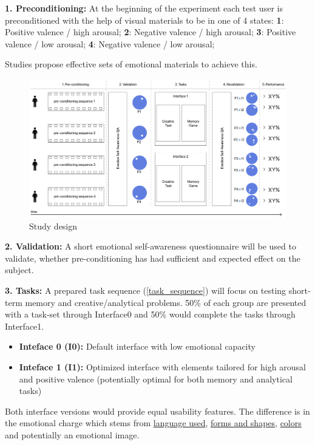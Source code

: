 \textbf{1. Preconditioning:} At the beginning of the experiment each test user is preconditioned with the help of visual materials to be in one of 4 states:
 \textbf{1}: Positive valence / high arousal; 
 \textbf{2}: Negative valence / high arousal;
 \textbf{3}: Positive valence / low arousal;
 \textbf{4}: Negative valence / low arousal;

Studies \citationneeded propose effective sets of emotional materials to achieve this.

\begin{figure}
	\begin{center}
		\includegraphics[width=1\textwidth]{images/study_design3.png}
		\caption{Study design\label{fig:scaled_diss}}
	\end{center}
\end{figure}

\textbf{2. Validation:} A short emotional self-awareness questionnaire will be used to validate, whether pre-conditioning has had sufficient and expected effect on the subject.

\textbf{3. Tasks:} A prepared task sequence (\ref{task_sequence}) will focus on testing short-term memory and creative/analytical problems. 
50\% of each group are presented with a task-set through Interface0 and 50\% would complete the tasks through Interface1.

\begin{itemize}
	\item \textbf{Inteface 0 (I0):} Default interface with low emotional capacity
	\item \textbf{Inteface 1 (I1):} Optimized interface with elements tailored for high arousal and positive valence (potentially optimal for both memory and analytical tasks) \citationneeded
\end{itemize}

Both interface versions would provide equal usability features. 
The difference is in the emotional charge which stems from \underline{language used}, \underline{forms and shapes}, \underline{colors} \citationneeded and potentially an emotional image.

